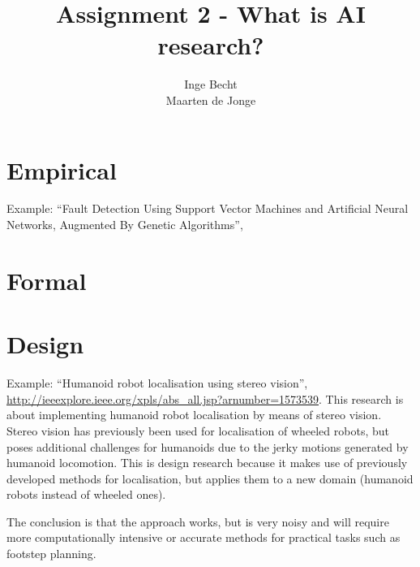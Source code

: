 \documentclass[a4paper, 12pt]{article}
\author{Inge Becht \\ Maarten de Jonge}
\title{Assignment 2 - What is AI research?}
\begin{document}
\maketitle

\section{Empirical}
Example: ``Fault Detection Using Support Vector Machines and Artificial Neural
Networks, Augmented By Genetic Algorithms'',


\section{Formal}

\section{Design}
Example: ``Humanoid robot localisation using stereo vision'',
\url{http://ieeexplore.ieee.org/xpls/abs\_all.jsp?arnumber=1573539}.
This research is about implementing humanoid robot localisation by means of
stereo vision. Stereo vision has previously been used for localisation of
wheeled robots, but poses additional challenges for humanoids due to the jerky
motions generated by humanoid locomotion.
This is design research because it makes use of previously developed methods for
localisation, but applies them to a new domain (humanoid robots instead of
wheeled ones).

The conclusion is that the approach works, but is very noisy and will require
more computationally intensive or accurate methods for practical tasks such as
footstep planning.
	
\end{document}
